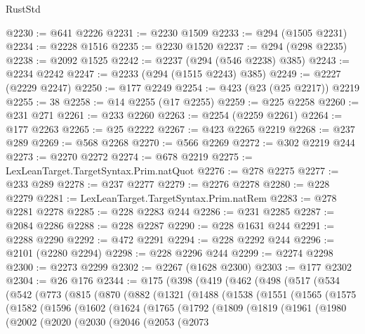 \begin{lexlean}{RustStd}
\begin{coremodule}
@2230 := @641 @2226
@2231 := @2230 @1509
@2233 := @294 (@1505 @2231)
@2234 := @2228 @1516
@2235 := @2230 @1520
@2237 := @294 (@298 @2235)
@2238 := @2092 @1525
@2242 := @2237 (@294 (@546 @2238) @385)
@2243 := @2234 @2242
@2247 := @2233 (@294 (@1515 @2243) @385)
@2249 := @2227 (@2229 @2247)
@2250 := @177 @2249
@2254 := @423 (@23 (@25 @2217)) @2219
@2255 := 38
@2258 := @14 @2255 (@17 @2255)
@2259 := @225 @2258
@2260 := @231 @271
@2261 := @233 @2260
@2263 := @2254 (@2259 @2261)
@2264 := @177 @2263
@2265 := @25 @2222
@2267 := @423 @2265 @2219
@2268 := @237 @289
@2269 := @568 @2268
@2270 := @566 @2269
@2272 := @302 @2219 @244
@2273 := @2270 @2272
@2274 := @678 @2219
@2275 := LexLeanTarget.TargetSyntax.Prim.natQuot
@2276 := @278 @2275
@2277 := @233 @289
@2278 := @237 @2277
@2279 := @2276 @2278
@2280 := @228 @2279
@2281 := LexLeanTarget.TargetSyntax.Prim.natRem
@2283 := @278 @2281 @2278
@2285 := @228 @2283 @244
@2286 := @231 @2285
@2287 := @2084 @2286
@2288 := @228 @2287
@2290 := @228 @1631 @244
@2291 := @2288 @2290
@2292 := @472 @2291
@2294 := @228 @2292 @244
@2296 := @2101 (@2280 @2294)
@2298 := @228 @2296 @244
@2299 := @2274 @2298
@2300 := @2273 @2299
@2302 := @2267 (@1628 @2300)
@2303 := @177 @2302
@2304 := @26 @176
@2344 := @175
    (@398
      (@419
        (@462
          (@498
            (@517
              (@534
                (@542
                  (@773
                    (@815
                      (@870
                        (@882
                          (@1321
                            (@1488
                              (@1538
                                (@1551
                                  (@1565
                                    (@1575
                                      (@1582
                                        (@1596
                                          (@1602
                                            (@1624
                                              (@1765
                                                (@1792
                                                  (@1809
                                                    (@1819
                                                      (@1961
                                                        (@1980
                                                          (@2002
                                                            (@2020
                                                              (@2030
                                                                (@2046
                                                                  (@2053
                                                                    (@2073

\end{coremodule}
\end{lexlean}
